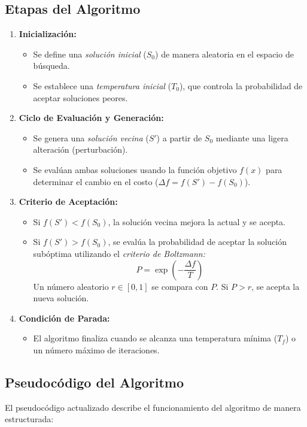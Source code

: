 \documentclass{article}
\begin{document}
\subsection{Etapas del Algoritmo}
\begin{enumerate}
    \item \textbf{Inicialización:}
    \begin{itemize}
        \item Se define una \textit{solución inicial} ($S_0$) de manera aleatoria en el espacio de búsqueda.
        \item Se establece una \textit{temperatura inicial} ($T_0$), que controla la probabilidad de aceptar soluciones peores.
    \end{itemize}
    
    \item \textbf{Ciclo de Evaluación y Generación:}
    \begin{itemize}
        \item Se genera una \textit{solución vecina} ($S'$) a partir de $S_0$ mediante una ligera alteración (perturbación).
        \item Se evalúan ambas soluciones usando la función objetivo $f(x)$ para determinar el cambio en el costo ($\Delta f = f(S') - f(S_0)$).
    \end{itemize}
    
    \item \textbf{Criterio de Aceptación:}
    \begin{itemize}
        \item Si $f(S') < f(S_0)$, la solución vecina mejora la actual y se acepta.
        \item Si $f(S') > f(S_0)$, se evalúa la probabilidad de aceptar la solución subóptima utilizando el \textit{criterio de Boltzmann:}
        \[
        P = \exp\left(-\frac{\Delta f}{T}\right)
        \]
        Un número aleatorio $r \in [0, 1]$ se compara con $P$. Si $P > r$, se acepta la nueva solución.
    \end{itemize}
    
    \item \textbf{Condición de Parada:}
    \begin{itemize}
        \item El algoritmo finaliza cuando se alcanza una temperatura mínima ($T_f$) o un número máximo de iteraciones.
    \end{itemize}
\end{enumerate}

\subsection{Pseudocódigo del Algoritmo}
El pseudocódigo actualizado describe el funcionamiento del algoritmo de manera estructurada:
\end{document}
